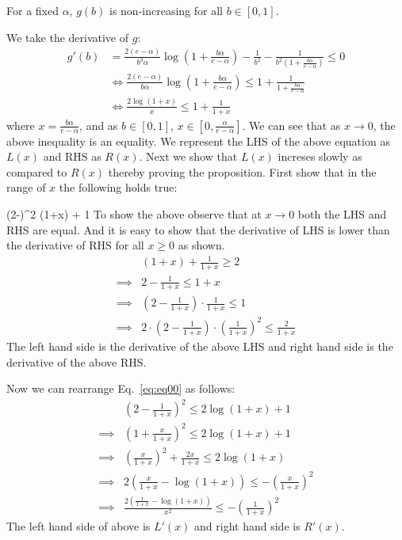 \begin{proposition}
For a fixed $\alpha$, $g(b)$ is non-increasing for all $b \in [0,1]$. 
\end{proposition}

\proof
We take the derivative of $g$:
\begin{align*}
g'(b) &= \frac{2(e-\alpha)}{b^3 \alpha} \log\left(1+\frac{b\alpha}{e-\alpha} \right) - \frac{1}{b^2}-\frac{1}{b^2\left(1+\frac{b\alpha}{e-\alpha}\right)} \leq 0 \\
&\iff \frac{2(e-\alpha)}{b \alpha} \log\left(1+\frac{b\alpha}{e-\alpha} \right) \leq 1+\frac{1}{1+\frac{b\alpha}{e-\alpha}} \\
&\iff \frac{2\log(1+x)}{x} \leq 1+\frac{1}{1+x}
\end{align*}
where $x = \frac{b\alpha}{e-\alpha}$, and as $b \in [0,1]$, $x \in [0, \frac{\alpha}{e-\alpha}]$. We can see that as $x \rightarrow 0$, the above inequality is an equality. 
We represent the LHS of the above equation as $L(x)$ and RHS as $R(x)$. Next we show that $L(x)$ increses slowly as compared to $R(x)$ thereby proving the proposition.
First show that in the range of $x$ the following holds true:

\beq
\label{eq:eq00}
\left(2-\right)^2 \log(1+x) + 1
\eeq
To show the above observe that at $x\rightarrow 0$ both the LHS and RHS are equal. And it is easy to show that the derivative of LHS is lower than the derivative of RHS for all $x\ge 0$ as shown.
\begin{align*}
& (1+x) + \frac{1}{1+x} \ge 2\\
\implies & 2 - \frac{1}{1+x} \le 1 + x\\
\implies & (2-\frac{1}{1+x})\cdot \frac{1}{1+x} \le 1\\
\implies & 2\cdot(2-\frac{1}{1+x})\cdot (\frac{1}{1+x})^2 \le \frac{2}{1+x}
\end{align*}
The left hand side is the derivative of the above LHS and right hand side is the derivative of the above RHS.

Now we can rearrange Eq.~\ref{eq:eq00} as follows:
\begin{align*}
& \left(2-\frac{1}{1+x}\right)^2 \le 2\log(1+x) + 1\\
\implies & (1 + \frac{x}{1+x})^2 \le 2\log(1+x) + 1\\
\implies & (\frac{x}{1+x})^2 + \frac{2x}{1+x} \le 2\log(1+x)\\
\implies & 2\left(\frac{x}{1+x} - \log(1+x)\right) \le - (\frac{x}{1+x})^2\\
\implies & \frac{2\left(\frac{x}{1+x} - \log(1+x)\right)}{x^2} \le - (\frac{1}{1+x})^2
\end{align*}
The left hand side of above is $L'(x)$ and right hand side is $R'(x)$.

